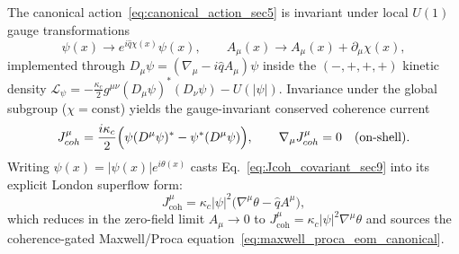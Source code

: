 The canonical action~\eqref{eq:canonical_action_sec5} is invariant under local $U(1)$ gauge transformations
\begin{equation}
\psi(x) \to e^{i\hat{q}\chi(x)}\psi(x),
\qquad
A_\mu(x) \to A_\mu(x) + \partial_\mu\chi(x),
\label{eq:u1_gauge_transform_sec9}
\end{equation}
implemented through $D_\mu\psi = (\nabla_\mu - i\hat{q}A_\mu)\psi$ inside the $(-,+,+,+)$ kinetic density $\mathcal{L}_\psi = -\frac{\kappa_c}{2}g^{\mu\nu}(D_\mu\psi)^*(D_\nu\psi) - U(|\psi|)$. Invariance under the global subgroup ($\chi = \mathrm{const}$) yields the gauge-invariant conserved coherence current
\begin{equation}
J^\mu_{\mathrm{coh}}
= \frac{i\kappa_c}{2}\Bigl(\psi(D^\mu\psi)^* - \psi^*(D^\mu\psi)\Bigr),
\qquad
\nabla_\mu J^\mu_{\mathrm{coh}} = 0 \quad (\text{on-shell}).
\label{eq:Jcoh_covariant_sec9}
\end{equation}
Writing $\psi(x) = |\psi(x)| e^{i\theta(x)}$ casts Eq.~\eqref{eq:Jcoh_covariant_sec9} into its explicit London superflow form:
\begin{equation}
J^\mu_{\mathrm{coh}} = \kappa_c |\psi|^2 \bigl(\nabla^\mu\theta - \hat{q}A^\mu\bigr),
\label{eq:Jcoh_london_sec9}
\end{equation}
which reduces in the zero-field limit $A_\mu \to 0$ to $J^\mu_{\mathrm{coh}} = \kappa_c |\psi|^2 \nabla^\mu\theta$ and sources the coherence-gated Maxwell/Proca equation~\eqref{eq:maxwell_proca_eom_canonical}.

